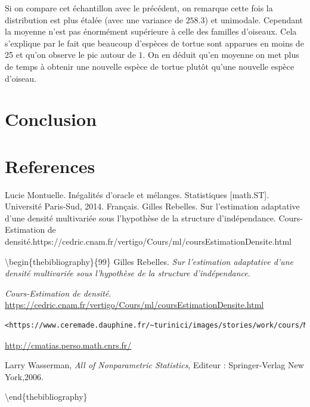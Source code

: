 \documentclass[
]{book}
\begin{document}
Si on compare cet échantillon avec le précédent, on remarque cette fois la distribution est plus étalée (avec une variance de \(258.3\)) et unimodale. Cependant la moyenne n'est pas énormément supérieure à celle des familles d'oiseaux. Cela s'explique par le fait que beaucoup d'espèces de tortue sont apparues en moins de 25 et qu'on observe le pic autour de \(1\).
On en déduit qu'en moyenne on met plus de temps à obtenir une nouvelle espèce de tortue plutôt qu'une nouvelle espèce d'oiseau.

\hypertarget{conclusion}{%
\chapter{Conclusion}\label{conclusion}}

\hypertarget{references}{%
\chapter{References}\label{references}}

Lucie Montuelle. Inégalités d'oracle et mélanges. Statistiques {[}math.ST{]}. Université Paris-Sud, 2014.
Français.\newline
Gilles Rebelles. Sur l'estimation adaptative d'une densité multivariée sous l'hypothèse de la structure d'indépendance.\newline
Cours-Estimation de densité.https://cedric.cnam.fr/vertigo/Cours/ml/coursEstimationDensite.html \newline

\textbackslash begin\{thebibliography\}\{99\}
Gilles Rebelles. \emph{Sur l'estimation adaptative d'une densité multivariée sous l'hypothèse de la structure d'indépendance}.

\emph{Cours-Estimation de densité}.
\url{https://cedric.cnam.fr/vertigo/Cours/ml/coursEstimationDensite.html}


\begin{verbatim}
<https://www.ceremade.dauphine.fr/~turinici/images/stories/work/cours/M1_stat_nonparamP20/stat_nonp_P20_annotations.pdf>
\end{verbatim}

\url{http://cmatias.perso.math.cnrs.fr/}

Larry Wasserman, \emph{ All of Nonparametric Statistics}, Editeur : Springer-Verlag New York,2006.

\textbackslash end\{thebibliography\}
\end{document}
